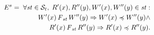 \documentclass[journal,compsoc]{IEEEtran}
\begin{document}
    \begin{align}\label{eqn:PC}
\begin{split}
E^{s} = \; \forall \mathit{st} \in \mathcal{S}_t, \; R'(x), R''(y), W'(x), W''(y) \in \mathit{st}: \\
 W'(x) \operatorname{\it F}_\mathit{st} W''(y)  \Rightarrow  W'(x) \preccurlyeq W''(y)  \wedge \\ R'(x) \operatorname{\it F}_\mathit{st} R''(y)  \Rightarrow  R'(x) \preccurlyeq R''(y).
\end{split}
  \end{align}   %
\end{document}
